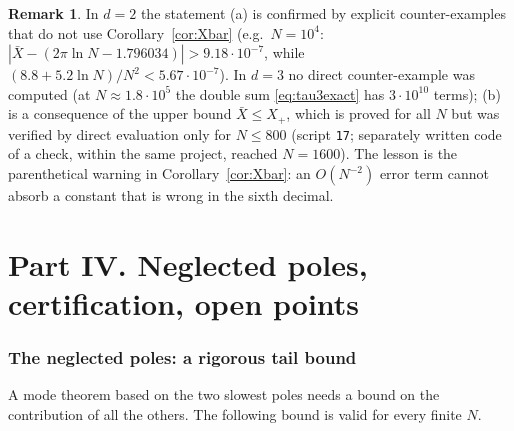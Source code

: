 \documentclass[11pt,a4paper]{article}
\newcommand{\Xb}{\bar X}
\theoremstyle{plain}
\theoremstyle{definition}
\newtheorem{remark}[theorem]{Remark}
\numberwithin{equation}{section}
\begin{document}
\begin{remark}
In $d=2$ the statement (a) is confirmed by explicit counter-examples that do not use Corollary~\ref{cor:Xbar} (e.g.\ $N=10^4$: $|\Xb-(2\pi\ln N-1.796034)|>9.18\cdot10^{-7}$, while $(8.8+5.2\ln N)/N^2<5.67\cdot10^{-7}$). In $d=3$ no direct counter-example was computed (at $N\approx1.8\cdot10^5$ the double sum \eqref{eq:tau3exact} has $3\cdot10^{10}$ terms); (b) is a consequence of the upper bound $\Xb\le X_+$, which is proved for all $N$ but was verified by direct evaluation only for $N\le800$ (script \texttt{17}; separately written code of a check, within the same project, reached $N=1600$). The lesson is the parenthetical warning in Corollary~\ref{cor:Xbar}: an $O(N^{-2})$ error term cannot absorb a constant that is wrong in the sixth decimal.
\end{remark}

\part*{Part IV. Neglected poles, certification, open points}
\section{The neglected poles: a rigorous tail bound}\label{sec:tail}

A mode theorem based on the two slowest poles needs a bound on the contribution of all the others. The following bound is valid for every finite $N$.
\end{document}
